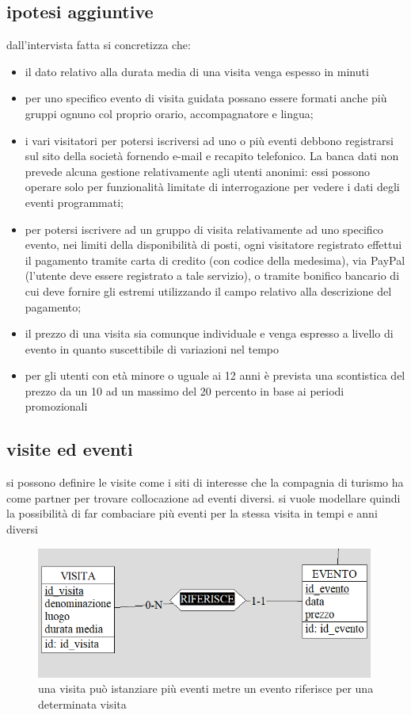 \documentclass[a4paper,12pt]{report}
\begin{document}
\subsection*{ipotesi aggiuntive}
dall'intervista fatta si concretizza che:
\begin{itemize}
    \item il dato relativo alla durata media di una visita venga espesso in minuti
    \item  per	uno	specifico	evento	di	visita	guidata	possano	essere	formati	anche	più	gruppi		ognuno	
    col	proprio	orario,	accompagnatore	e	lingua; 
    \item i	 vari	 visitatori	 per	 potersi	 iscriversi	 ad	 uno	 o	 più	 eventi	 debbono	 registrarsi	 sul	 sito	 della	
    società	 fornendo	 e-mail	 e	 recapito	 telefonico.	 La	 banca	 dati	 non	 prevede	 alcuna	 gestione	
    relativamente	 agli	 utenti	 anonimi:	 essi	 possono	 operare	 solo	 per	 funzionalità	 limitate	 di	
    interrogazione	per	vedere	i	dati	degli	eventi	programmati;
    \item per	potersi	iscrivere	ad	un	gruppo	di	visita	relativamente	ad	uno	specifico	evento,	nei	limiti	
    della	 disponibilità	 di	 posti,	 ogni	 visitatore	 registrato	 effettui	 il	 pagamento	 tramite	 carta	 di	
    credito	 (con	 codice	 della	 medesima),	 via	 PayPal	 (l’utente	 deve	 essere	 registrato	 a	 tale	
    servizio),	 o	 tramite	 bonifico	 bancario	 di	 cui	 deve	 fornire	 gli	 estremi	 utilizzando	 il	 campo	
    relativo	alla	descrizione	del	pagamento;
    \item il	prezzo	di	una	visita	sia	comunque	individuale	e	venga	espresso	a	livello	di	evento	in	quanto
    suscettibile	di	variazioni	nel	tempo
    \item per gli utenti con età minore o uguale ai 12 anni è prevista una scontistica del prezzo da un 10 ad un massimo del 20 percento in base ai
    periodi promozionali
\end{itemize}

\subsection*{visite ed eventi}
si possono definire le visite come i siti di interesse che la compagnia di turismo 
ha come partner per trovare collocazione ad eventi diversi. si vuole modellare quindi la 
possibilità di far combaciare più eventi per la stessa visita in tempi e anni diversi
\begin{figure}[H]
    \centering
    \includegraphics[width=0.99\textwidth]{visita-evento.png}
    \caption[short]{una visita può istanziare più eventi metre 
    un evento riferisce per una determinata visita}
    
\end{figure}
\end{document}
